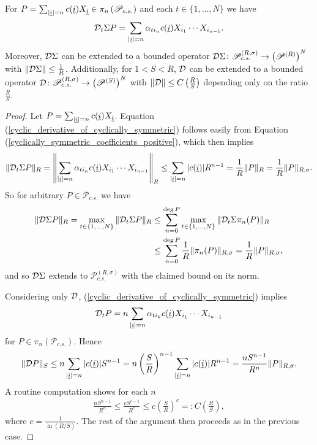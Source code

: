 \begin{lem}\label{cyclic_derivative_bounded}
For $P = \sum_{|\underline{i}|=n}c(\underline{i})X_{\underline{i}} \in \pi_n\left(\mathscr{P}_{c.s.}\right)$ and each $t\in\{1,\ldots, N\}$ we have
	\begin{equation}\label{cyclic_derivative_of_cyclically_symmetric}
		\mathcal D_t \Sigma P=\sum_{|\underline{i}|=n} \alpha_{t i_n} c(\underline{i}) X_{i_1}\cdots X_{i_{n-1}}.
	\end{equation}
Moreover, $\mathcal D\Sigma$ can be extended to a bounded operator $\mathcal D\Sigma\colon \mathscr{P}_{c.s.}^{(R,\sigma)}\rightarrow \left(\mathscr{P}^{(R)}\right)^N$ with $\|\mathcal D\Sigma \|\leq \frac{1}{R}$. Additionally, for $1<S<R$, $\mathcal D$ can be extended to a bounded operator $\mathcal D\colon \mathscr{P}_{c.s.}^{(R,\sigma)}\rightarrow \left(\mathscr{P}^{(S)}\right)^N$ with $\|\mathcal D\| \leq C\left(\frac{R}{S}\right)$ depending only on the ratio $\frac{R}{S}$.
\end{lem}
\begin{proof}
Let $P=\sum_{|\underline{i}|=n} c(\underline{i}) X_{\underline{i}}$. Equation (\ref{cyclic_derivative_of_cyclically_symmetric}) follows easily from Equation (\ref{cyclically_symmetric_coefficients_positive}), which then implies
	\begin{align*}
		\| \mathcal D_t\Sigma P\|_R= \left\| \sum_{|\underline{i}|=n} \alpha_{t i_n} c(\underline{i}) X_{i_1}\cdots X_{i_{n-1}}\right\|_R \leq \sum_{|\underline{i}|=n} |c(\underline{i})| R^{n-1} = \frac{1}{R} \|P\|_{R}=\frac{1}{R} \|P\|_{R,\sigma}.
	\end{align*}
So for arbitrary $P\in \mathscr{P}_{c.s.}$ we have
	\begin{align*}
		\| \mathcal D\Sigma P\|_R =\max_{t\in\{1,\ldots,N\}} \|\mathcal D_t\Sigma P\|_R &\leq \sum_{n=0}^{\deg{P}} \max_{t\in\{1,\ldots,N\}} \|\mathcal D_t\Sigma \pi_n(P)\|_R \\
			&\leq \sum_{n=0}^{\deg{P}} \frac{1}{R} \|\pi_n(P)\|_{R,\sigma} = \frac{1}{R} \|P\|_{R,\sigma},
	\end{align*}
and so $\mathcal D\Sigma$ extends to $\mathscr{P}_{c.s.}^{(R,\sigma)}$ with the claimed bound on its norm.\par
Considering only $\mathcal D$,  (\ref{cyclic_derivative_of_cyclically_symmetric}) implies
	\begin{align*}
		\mathcal D_t  P=n\sum_{|\underline{i}|=n} \alpha_{t i_k} c(\underline{i}) X_{i_1}\cdots X_{i_{n-1}}
	\end{align*}
for $P\in\pi_n\left(\mathscr{P}_{c.s.}\right)$. Hence
	\begin{align*}
		\| \mathcal D P\|_S \leq n \sum_{|\underline{i}|=n} |c(\underline{i})| S^{n-1} = n\left(\frac{S}{R}\right)^{n-1} \sum_{|\underline{i}|=n} |c(\underline{i})| R^{n-1} = \frac{ n S^{n-1}}{R^n} \|P\|_{R,\sigma}.
	\end{align*}
A routine computation shows for each $n$
	\begin{align*}
		\frac{ n S^{n-1}}{R^n} \leq \frac{ c S^{c-1}}{R^c}\leq c\left(\frac{S}{R}\right)^c=:C\left(\frac{R}{S}\right),
	\end{align*}
where $c=\frac{1}{\ln(R/S)}$. The rest of the argument then proceeds as in the previous case.
\end{proof}

